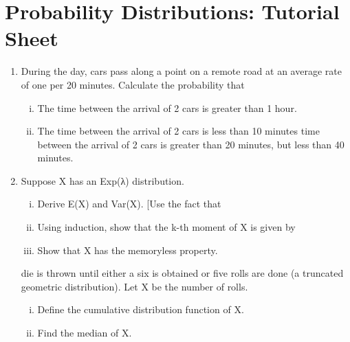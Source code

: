 \documentclass[]{report}
\begin{document}
\section{Probability Distributions: Tutorial Sheet }
\begin{enumerate}
\item During the day, cars pass along a point on a remote road at an average rate of one per 20 minutes. Calculate the probability that 
\begin{enumerate}[(i)]
\item The time between the arrival of 2 cars is greater than 1 hour.
\item The time between the arrival of 2 cars is less than 10 minutes 
\itemThe time between the arrival of 2 cars is greater than 20 minutes, but less than 40 minutes. 

\end{enumerate}

\item Suppose X has an Exp(λ) distribution.
\begin{enumerate}[(i)]
\item Derive E(X) and Var(X). [Use the fact that 
\item Using induction, show that the k-th moment of X is given by %
\item       Show that X has the memoryless property.
\end{enumerate}


\itemA die is thrown until either a six is obtained or five rolls are done (a truncated geometric distribution). Let X be the number of rolls.
\begin{enumerate}[(i)]
\item Define the cumulative distribution function of X.
\item Find the median of X.
\end{enumerate}



\end{enumerate}
\end{document}
